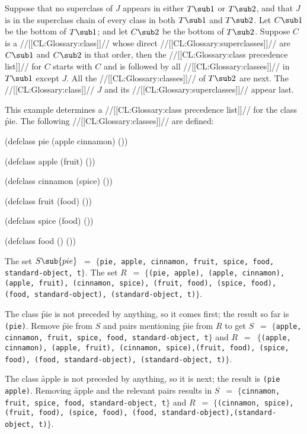Suppose that no superclass of $J$ appears in either $T\sub 1$ or $T\sub 2$, and that $J$ is in the superclass chain of every class in both $T\sub 1$ and $T\sub 2$.
    Let $C\sub 1$ be the bottom of $T\sub 1$;  and let $C\sub 2$ be the bottom of $T\sub 2$. Suppose $C$ is a //[[CL:Glossary:class]]// whose direct //[[CL:Glossary:superclasses]]// are $C\sub 1$ and $C\sub 2$ in that order, then the //[[CL:Glossary:class precedence list]]// for $C$ starts with $C$ and is followed by all //[[CL:Glossary:classes]]// in $T\sub 1$ except $J$.  All the //[[CL:Glossary:classes]]// of $T\sub 2$ are next. The //[[CL:Glossary:class]]// $J$ and its //[[CL:Glossary:superclasses]]// appear last.

\endsubsubsection%


This example determines a //[[CL:Glossary:class precedence list]]// for the class \f{pie}.  The following //[[CL:Glossary:classes]]// are defined:

\code
 (defclass pie (apple cinnamon) ())
 
 (defclass apple (fruit) ())
 
 (defclass cinnamon (spice) ())
 
 (defclass fruit (food) ())

 (defclass spice (food) ())

 (defclass food () ()) \endcode

The set $S\sub{pie}$~$=$ $\{${\tt pie, apple, cinnamon, fruit, spice, food, standard-object, t}$\}$. The set $R$~$=$ $\{${\tt (pie, apple), (apple, cinnamon), (apple, fruit), (cinnamon, spice), \hfil\break (fruit, food), (spice, food), (food, standard-object), (standard-object, t)}$\}$.

The class \f{pie} is not preceded by anything, so it comes first; the result so far is {\tt (pie)}.  Remove \f{pie} from $S$ and pairs mentioning \f{pie} from $R$ to get $S$~$=$ $\{${\tt apple, cinnamon, fruit, spice, food, standard-object, t}$\}$ and $R$~$=$~$\{${\tt (apple, cinnamon), (apple, fruit), (cinnamon, spice),\hfil\break (fruit, food), (spice, food), (food, standard-object), (standard-object, t)}$\}$.

The class \f{apple} is not preceded by anything, so it is next; the result is {\tt (pie apple)}. Removing \f{apple} and the relevant pairs results in $S$~$=$ $\{${\tt cinnamon, fruit, spice, food, standard-object, t}$\}$ and $R$~$=$ $\{${\tt (cinnamon, spice), (fruit, food), (spice, food), (food, standard-object),\hfil\break (standard-object, t)}$\}$.

